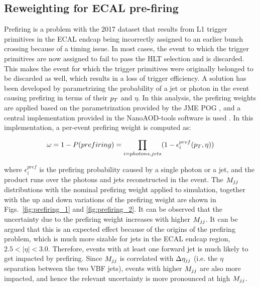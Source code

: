 \clearpage

\subsection{Reweighting for ECAL pre-firing}
\label{subsec:prefiring_weighting}

Prefiring is a problem with the 2017 dataset that results from L1 trigger primitives
in the ECAL endcap being incorrectly assigned to an earlier bunch crossing because
of a timing issue. In most cases, the event to which the trigger primitives are now assigned to
fail to pass the HLT selection and is discarded. This makes the event for which the trigger
primitives were originally belonged to be discarded as well, which results in a loss of trigger
efficiency. A solution has been developed by parametrizing
the probability of a jet or photon in the event causing prefiring in terms of their
$p_T$ and $\eta$. In this analysis, the prefiring weights are applied based on the parametrization
provided by the JME POG \cite{CMS:PrefiringTwiki}, and a central implementation provided in the
NanoAOD-tools software is used \cite{CMS:PrefiringNanoAODTools}. In this implementation, a per-event
prefiring weight is computed as:

\begin{equation}
    \omega = 1 - P(prefiring) = \prod_{i=photons,jets} (1 - \epsilon_{i}^{pref}(p_T, \eta))
\end{equation}

where $\epsilon_{i}^{pref}$ is the prefiring probability caused by a single photon or a jet, and the product
runs over the photons and jets reconstructed in the event.
The $M_{jj}$ distributions with the nominal prefiring weight applied to simulation, together with the
up and down variations of the prefiring weight are shown in Figs.~\ref{fig:prefiring_1} and \ref{fig:prefiring_2}.
It can be observed that the uncertainty due to the prefiring weight increases with higher $M_{jj}$. It can be argued
that this is an expected effect because of the origins of the prefiring problem, which is much more sizable for jets
in the ECAL endcap region, $2.5 < |\eta| < 3.0$. Therefore, events with at least one forward jet is much likely to
get impacted by prefiring. Since $M_{jj}$ is correlated with $\Delta \eta_{jj}$ (i.e. the $\eta$ separation between the two
VBF jets), events with higher $M_{jj}$ are also more impacted, and hence the relevant uncertainty is more pronounced
at high $M_{jj}$. 

